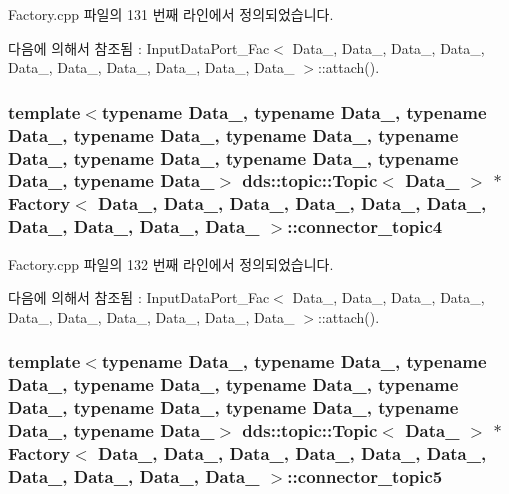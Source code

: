 Factory.\+cpp 파일의 131 번째 라인에서 정의되었습니다.



다음에 의해서 참조됨 \+:  Input\+Data\+Port\+\_\+\+Fac$<$ Data\+\_, Data\+\_, Data\+\_, Data\+\_, Data\+\_, Data\+\_, Data\+\_, Data\+\_, Data\+\_, Data\+\_ $>$\+::attach().

\subsubsection[{\texorpdfstring{connector\+\_\+topic4}{connector_topic4}}]{\setlength{\rightskip}{0pt plus 5cm}template$<$typename Data\+\_, typename Data\+\_, typename Data\+\_, typename Data\+\_, typename Data\+\_, typename Data\+\_, typename Data\+\_, typename Data\+\_, typename Data\+\_, typename Data\+\_$>$ dds\+::topic\+::\+Topic$<$ Data\+\_ $>$ $\ast$ {\bf Factory}$<$ Data\+\_, Data\+\_, Data\+\_, Data\+\_, Data\+\_, Data\+\_, Data\+\_, Data\+\_, Data\+\_, Data\+\_ $>$\+::connector\+\_\+topic4}\hypertarget{classFactory_a89e5876a2d5f8d4c48fe48023450a8cc}{}\label{classFactory_a89e5876a2d5f8d4c48fe48023450a8cc}


Factory.\+cpp 파일의 132 번째 라인에서 정의되었습니다.



다음에 의해서 참조됨 \+:  Input\+Data\+Port\+\_\+\+Fac$<$ Data\+\_, Data\+\_, Data\+\_, Data\+\_, Data\+\_, Data\+\_, Data\+\_, Data\+\_, Data\+\_, Data\+\_ $>$\+::attach().

\subsubsection[{\texorpdfstring{connector\+\_\+topic5}{connector_topic5}}]{\setlength{\rightskip}{0pt plus 5cm}template$<$typename Data\+\_, typename Data\+\_, typename Data\+\_, typename Data\+\_, typename Data\+\_, typename Data\+\_, typename Data\+\_, typename Data\+\_, typename Data\+\_, typename Data\+\_$>$ dds\+::topic\+::\+Topic$<$ Data\+\_ $>$ $\ast$ {\bf Factory}$<$ Data\+\_, Data\+\_, Data\+\_, Data\+\_, Data\+\_, Data\+\_, Data\+\_, Data\+\_, Data\+\_, Data\+\_ $>$\+::connector\+\_\+topic5}\hypertarget{classFactory_abb59b6717eb779f8cf2dfdab552319cc}{}\label{classFactory_abb59b6717eb779f8cf2dfdab552319cc}



